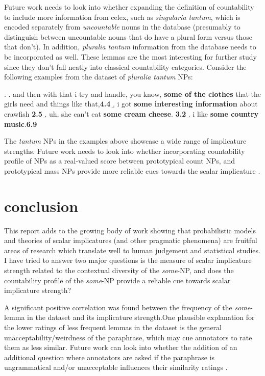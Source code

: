 \documentclass[10pt, biblatex, linguex]{report}
\begin{document}
Future work needs to look into whether expanding the definition of countability
to include more information from {\rmsc celex}, such as \textit{singularia
tantum}, which is encoded separately from \textit{uncountable} nouns in the
database (presumably to distinguish between uncountable nouns that do have a
plural form versus those that don't). In addition, \textit{pluralia tantum}
information from the database needs to be incorporated as well. These lemmas
are the most interesting for further study since they don't fall neatly into
classical countability categories. Consider the
following examples from the dataset of \textit{pluralia tantum} NPs:

\ex. \a. and then with that i try and handle, you know, \textbf{some of the
         clothes} that the girls need and things like that,\hfill \textbf{4.4}
     \b. i got \textbf{some interesting information} about crawfish \hfill \textbf{2.5}
     \b. uh, she can't eat \textbf{some cream cheese}. \hfill \textbf{3.2}
     \b. i like \textbf{some country music}.\hfill \textbf{6.9}

The \textit{tantum} NPs in the examples above showcase a wide range of implicature
strengths. Future work needs to look into whether incorporating countability
profile of NPs as a real-valued score between prototypical count NPs, and
prototypical mass NPs provide more reliable cues towards the scalar implicature
\citep{grimmgrammatical2018}.

\section{conclusion}
\label{sec:conclusion}

This report adds to the growing body of work showing that probabilistic models
and theories of scalar implicatures (and other pragmatic phenomena) are fruitful
areas of research which translate well to human judgement and statistical
studies. I have tried to answer two major questions \dash is the measure
of scalar implicature strength related to the contextual diversity of the
\textit{some}-NP, and does the countability profile of the \textit{some}-NP
provide a reliable cue towards scalar implicature strength?

A significant positive correlation was found between the frequency of the
\textit{some}-lemma in the dataset and its implicature strength.One plausible
explanation for the lower ratings of less frequent lemmas in the
dataset is the general unacceptability/weirdness of the paraphrase, which may
cue annotators to rate them as less similar. Future work can look into whether
the addition of an additional question where annotators are asked if the
paraphrase is ungrammatical and/or unacceptable influences their similarity
ratings \citep{white_computational_2016}.
\end{document}

